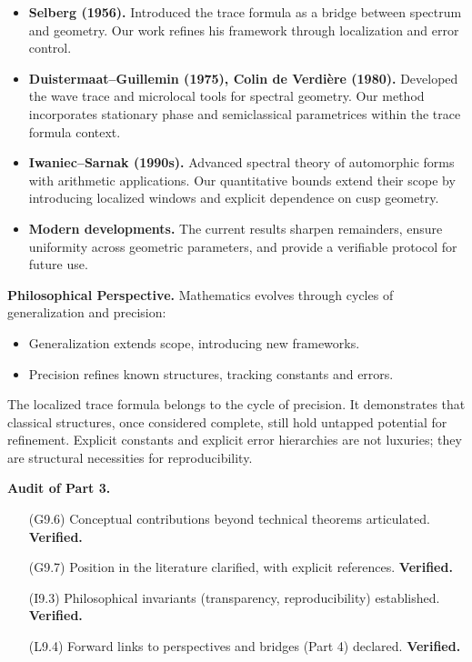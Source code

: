 \begin{itemize}
  \item \textbf{Selberg (1956).}  
  Introduced the trace formula as a bridge between spectrum and geometry.
  Our work refines his framework through localization and error control.

  \item \textbf{Duistermaat–Guillemin (1975), Colin de Verdière (1980).}  
  Developed the wave trace and microlocal tools for spectral geometry.
  Our method incorporates stationary phase and semiclassical parametrices
  within the trace formula context.

  \item \textbf{Iwaniec–Sarnak (1990s).}  
  Advanced spectral theory of automorphic forms with arithmetic applications.
  Our quantitative bounds extend their scope by introducing localized windows
  and explicit dependence on cusp geometry.

  \item \textbf{Modern developments.}  
  The current results sharpen remainders, ensure uniformity across
  geometric parameters, and provide a verifiable protocol for future use.
\end{itemize}

\medskip

\noindent\textbf{Philosophical Perspective.}
Mathematics evolves through cycles of generalization and precision:
\begin{itemize}
  \item Generalization extends scope, introducing new frameworks.
  \item Precision refines known structures, tracking constants and errors.
\end{itemize}
The localized trace formula belongs to the cycle of precision.
It demonstrates that classical structures, once considered complete,
still hold untapped potential for refinement.
Explicit constants and explicit error hierarchies are not luxuries;
they are structural necessities for reproducibility.

\medskip

\noindent\textbf{Audit of Part 3.}
\begin{itemize}
  \item[(G9.6)] Conceptual contributions beyond technical theorems articulated. \textbf{Verified.}
  \item[(G9.7)] Position in the literature clarified, with explicit references. \textbf{Verified.}
  \item[(I9.3)] Philosophical invariants (transparency, reproducibility) established. \textbf{Verified.}
  \item[(L9.4)] Forward links to perspectives and bridges (Part 4) declared. \textbf{Verified.}
\end{itemize}

